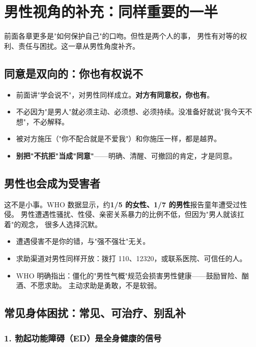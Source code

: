 \documentclass[12pt,UTF8,openany]{ctexbook}
\begin{document}
\tableofcontents
\clearpage
\chapter{男性视角的补充：同样重要的一半}
\label{chap:male}

前面各章更多是"如何保护自己"的口吻。但性是两个人的事，
男性有对等的权利、责任与困扰。这一章从男性角度补齐。

\section{同意是双向的：你也有权说不}

\begin{itemize}[leftmargin=2em]
  \item 前面讲"学会说不"，对男性同样成立。\textbf{对方有同意权，你也有}。
  \item 不必因为"是男人"就必须主动、必须想、必须持续。没准备好就说"我今天不想"，不必解释。
  \item 被对方施压（"你不配合就是不爱我"）和你施压一样，都是越界。
  \item \textbf{别把"不抗拒"当成"同意"}——明确、清醒、可撤回的肯定，才是同意。
\end{itemize}

\section{男性也会成为受害者}

这不是小事。WHO 数据显示，约\textbf{1/5 的女性、1/7 的男性}报告童年遭受过性侵。
男性遭遇性骚扰、性侵、亲密关系暴力的比例不低，但因为"男人就该扛着"的观念，
很多人选择沉默。

\begin{itemize}[leftmargin=2em]
  \item 遭遇侵害不是你的错，与"强不强壮"无关。
  \item 求助渠道对男性同样开放：拨打 110、12320，或联系医院、可信任的人。
  \item WHO 明确指出：僵化的"男性气概"规范会损害男性健康——鼓励冒险、酗酒、不愿求助。
        主动求助是勇敢，不是软弱。
\end{itemize}

\section{常见身体困扰：常见、可治疗、别乱补}

\subsection*{1. 勃起功能障碍（ED）是全身健康的信号}
\end{document}
